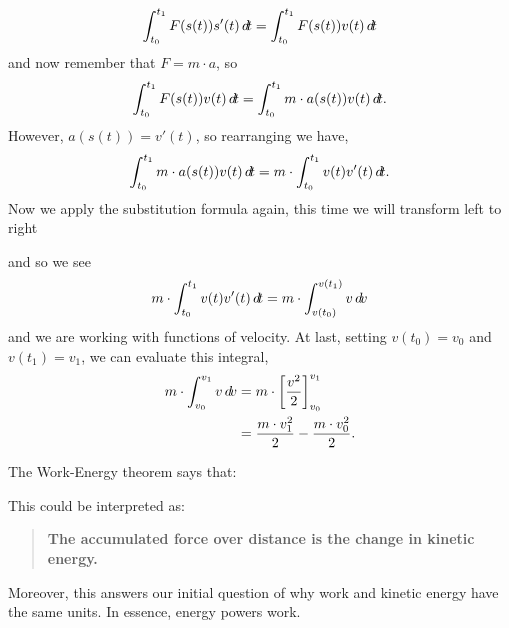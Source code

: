\documentclass{ximera}
\begin{document}
\begin{theorem}
\begin{explanation}
    \[
    \int_{t_0}^{t_1} F(s(t)) s'(t) \mathop{}\!d\! t = \int_{t_0}^{t_1} F(s(t)) v(t) \mathop{}\!d\! t
    \]
    and now remember that $F=m\cdot a$, so
    \[
    \int_{t_0}^{t_1} F(s(t)) v(t) \mathop{}\!d\! t = \int_{t_0}^{t_1} m\cdot a(s(t)) v(t) \mathop{}\!d\! t.
    \]
    However, $a(s(t)) = v'(t)$, so rearranging we have,
    \[
    \int_{t_0}^{t_1} m\cdot a(s(t)) v(t) \mathop{}\!d\! t = m\cdot \int_{t_0}^{t_1} v(t) v'(t)\mathop{}\!d\! t.
    \]
    Now we apply the substitution formula again, this time we will transform left to right
    \begin{image}
    \end{image}
    and so we see
    \[
    m\cdot \int_{t_0}^{t_1} v(t) v'(t)\mathop{}\!d\! t = m\cdot \int_{v(t_0)}^{v(t_1)} v \mathop{}\!d\! v
    \]
    and we are working with functions of velocity.  At last, setting
    $v(t_0) = v_0$ and $v(t_1) = v_1$, we can evaluate this integral,
    \begin{align*}
      m \cdot \int_{v_0}^{v_1} v \mathop{}\!d\! v &= m \cdot \bigg[ \frac{v^2}{2} \bigg]_{v_0}^{v_1}\\
      &=\frac{m\cdot v_1^2}{2} - \frac{m\cdot v_0^2}{2}.
    \end{align*}
  \end{explanation}
\end{theorem}

The Work-Energy theorem says that:
\begin{center}
\end{center}
This could be interpreted as:
\begin{quote}\large\textbf{The \textcolor{green!70!black!70!blue}{accumulated} \textcolor{purple!50!blue!90!black}{force} \textcolor{green!70!black!70!blue}{over distance} is the \textcolor{blue!70!green}{change in kinetic energy}.}
\end{quote}
Moreover, this answers our initial question of why work and kinetic
energy have the same units.  In essence, energy powers work.
\end{document}
